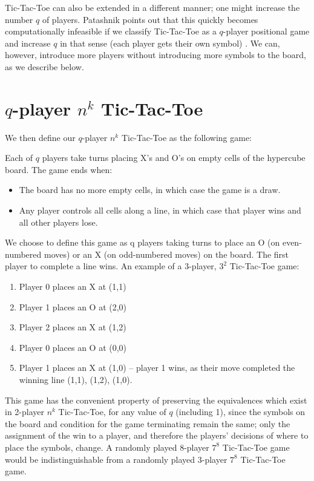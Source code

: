 \documentclass[english, 11pt]{article}
\begin{document}

Tic-Tac-Toe can also be extended in a different manner; one might increase the number $q$ of players. Patashnik points out that this quickly becomes computationally infeasible if we classify Tic-Tac-Toe as a $q$-player positional game and increase $q$ in that sense (each player gets their own symbol) \cite{patash}. We can, however, introduce more players without introducing more symbols to the board, as we describe below.

\section*{$q$-player $n^k$ Tic-Tac-Toe}


We then define our $q$-player $n^k$ Tic-Tac-Toe as the following game:

Each of $q$ players take turns placing X's and O's on empty cells of the hypercube board. The game ends when:
\begin{itemize}
\item The board has no more empty cells, in which case the game is a draw.
\item Any player controls all cells along a line, in which case that player wins and all other players lose. 
\end{itemize}

We choose to define this game as q players taking turns to place an O (on even-numbered moves) or an X (on odd-numbered moves) on the board. The first player to complete a line wins. An example of a 3-player, $3^2$ Tic-Tac-Toe game:
	\begin{enumerate}
		\item Player 0 places an X at (1,1)
		\item Player 1 places an O at (2,0)
		\item Player 2 places an X at (1,2)
		\item Player 0 places an O at (0,0)
		\item Player 1 places an X at (1,0) – player 1 wins, as their move completed the winning line {(1,1), (1,2), (1,0)}. 
	\end{enumerate}
	This game has the convenient property of preserving the equivalences which exist in 2-player $n^k$ Tic-Tac-Toe, for any value of $q$ (including 1), since the symbols on the board and condition for the game terminating remain the same; only the assignment of the win to a player, and therefore the players' decisions of where to place the symbols, change. A randomly played 8-player $7^8$ Tic-Tac-Toe game would be indistinguishable from a randomly played 3-player $7^8$ Tic-Tac-Toe game.
\end{document}
